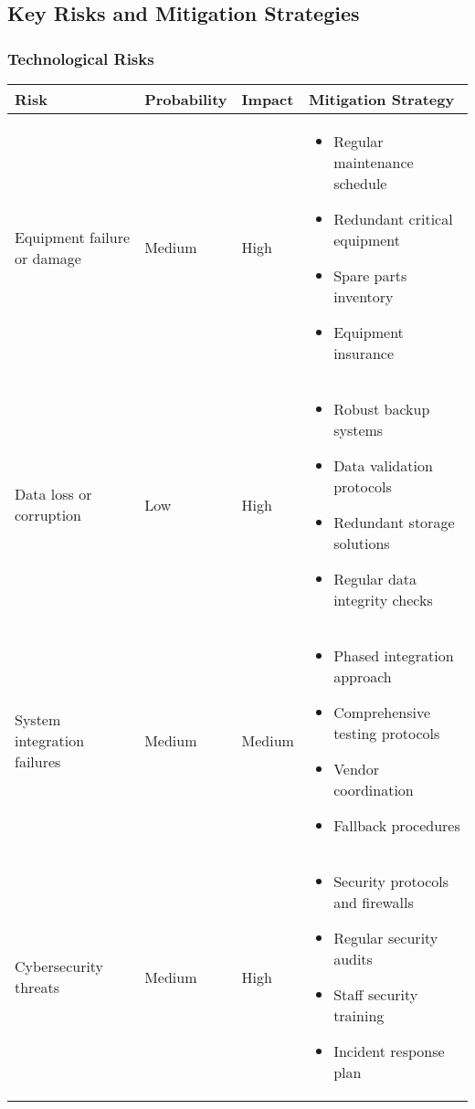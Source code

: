 \subsection{Key Risks and Mitigation Strategies}

\subsubsection{Technological Risks}
\begin{table}[H]
\centering
\begin{tabular}{|p{3cm}|p{2cm}|p{2cm}|p{7cm}|}
\hline
\textbf{Risk} & \textbf{Probability} & \textbf{Impact} & \textbf{Mitigation Strategy} \\
\hline
Equipment failure or damage & Medium & High & 
\begin{itemize}
    \item Regular maintenance schedule
    \item Redundant critical equipment
    \item Spare parts inventory
    \item Equipment insurance
\end{itemize} \\
\hline
Data loss or corruption & Low & High & 
\begin{itemize}
    \item Robust backup systems
    \item Data validation protocols
    \item Redundant storage solutions
    \item Regular data integrity checks
\end{itemize} \\
\hline
System integration failures & Medium & Medium & 
\begin{itemize}
    \item Phased integration approach
    \item Comprehensive testing protocols
    \item Vendor coordination
    \item Fallback procedures
\end{itemize} \\
\hline
Cybersecurity threats & Medium & High & 
\begin{itemize}
    \item Security protocols and firewalls
    \item Regular security audits
    \item Staff security training
    \item Incident response plan

\end{itemize}
\end{tabular}
\end{table}
